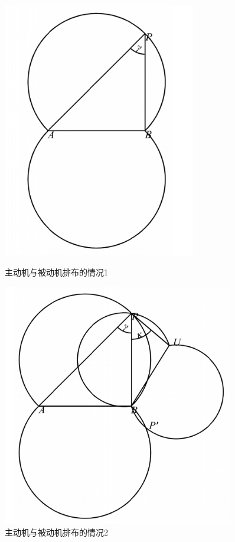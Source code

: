 \documentclass[withoutpreface,bwprint]{cumcmthesis} %
\begin{document}
\begin{figure}[H]
    \centering
    \begin{minipage}{0.49\textwidth}
        \centering
        \includegraphics[width=0.75\textwidth]{../../figure/q2_1.png} 
        \caption{主动机与被动机排布的情况1}
        \label{q2_1}
    \end{minipage}
    \begin{minipage}{0.49\textwidth}
        \centering
        \includegraphics[width=0.9\textwidth]{../../figure/q2_2.png} 
        \caption{主动机与被动机排布的情况2}
        \label{q2_2}   
    \end{minipage}
\end{figure}
\end{document}

